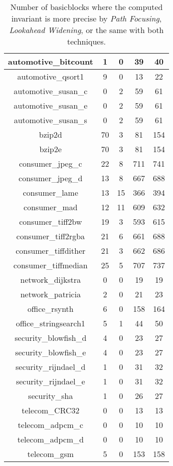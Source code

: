 \documentclass[a4paper,english,titlepage,11pt]{report}
\begin{document}
\begin{table}[!h]
\begin{tabular}{|c||c|c|c|c|}
automotive\_bitcount & 1 & 0 & 39 & 40 \\ \hline
automotive\_qsort1 & 9 & 0 & 13 & 22 \\ \hline
automotive\_susan\_c & 0 & 2 & 59 & 61 \\ \hline
automotive\_susan\_e & 0 & 2 & 59 & 61 \\ \hline
automotive\_susan\_s & 0 & 2 & 59 & 61 \\ \hline
bzip2d & 70 & 3 & 81 & 154 \\ \hline
bzip2e & 70 & 3 & 81 & 154 \\ \hline
consumer\_jpeg\_c & 22 & 8 & 711 & 741 \\ \hline
consumer\_jpeg\_d & 13 & 8 & 667 & 688 \\ \hline
consumer\_lame & 13 & 15 & 366 & 394 \\ \hline
consumer\_mad & 12 & 11 & 609 & 632 \\ \hline
consumer\_tiff2bw & 19 & 3 & 593 & 615 \\ \hline
consumer\_tiff2rgba & 21 & 6 & 661 & 688 \\ \hline
consumer\_tiffdither & 21 & 3 & 662 & 686 \\ \hline
consumer\_tiffmedian & 25 & 5 & 707 & 737 \\ \hline
network\_dijkstra & 0 & 0 & 19 & 19 \\ \hline
network\_patricia & 2 & 0 & 21 & 23 \\ \hline
office\_rsynth & 6 & 0 & 158 & 164 \\ \hline
office\_stringsearch1 & 5 & 1 & 44 & 50 \\ \hline
security\_blowfish\_d & 4 & 0 & 23 & 27 \\ \hline
security\_blowfish\_e & 4 & 0 & 23 & 27 \\ \hline
security\_rijndael\_d & 1 & 0 & 31 & 32 \\ \hline
security\_rijndael\_e & 1 & 0 & 31 & 32 \\ \hline
security\_sha & 1 & 0 & 26 & 27 \\ \hline
telecom\_CRC32 & 0 & 0 & 13 & 13 \\ \hline
telecom\_adpcm\_c & 0 & 0 & 10 & 10 \\ \hline
telecom\_adpcm\_d & 0 & 0 & 10 & 10 \\ \hline
telecom\_gsm & 5 & 0 & 153 & 158 \\ \hline
\end{tabular}
\caption{Number of basicblocks where the computed invariant is more precise by
\emph{Path Focusing}, \emph{Lookahead Widening}, or the same with both
techniques.}
\label{cbench}
\end{table}
\end{document}
